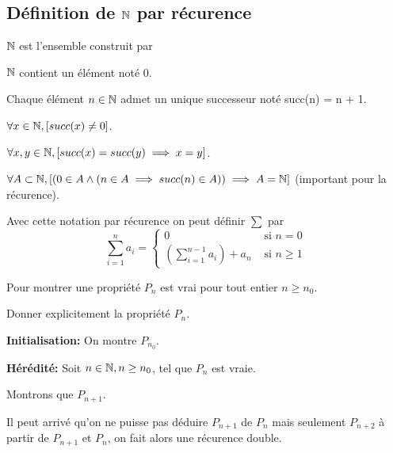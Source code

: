 \documentclass[a4paper, 12pt]{article}
\begin{document}
\subsection{Définition de $\mathbb{N}$ par récurence}

\begin{definition}
    $\mathbb{N}$ est l'ensemble construit par

    \vspace{1em}

    \item $\mathbb{N}$ contient un élément noté 0.
    \item Chaque élément $n \in \mathbb{N}$ admet un unique successeur noté succ(n) = n + 1.
    \item $\forall x \in \mathbb{N}, [succ(x) \neq 0]$.
    \item $\forall x, y \in \mathbb{N}, [succ(x) = succ(y) \implies x = y]$.
    \item $\forall A \subset \mathbb{N}, [(0 \in A \land (n \in A \implies succ(n) \in A)) \implies A = \mathbb{N}]$
    (important pour la récurence).
\end{definition}

\begin{remark}
    Avec cette notation par récurence on peut définir $\sum$ par
    \begin{equation*}
        \sum_{i=1}^{n}a_i =
        \begin{cases}
            0 &\text{ si } n = 0\\
            (\sum_{i=1}^{n-1}a_i) + a_n &\text{ si } n \geq 1
        \end{cases}
    \end{equation*}
\end{remark}

\begin{methode}
    Pour montrer une propriété $P_n$ est vrai pour tout entier $n \geq n_0$.

    \item Donner explicitement la propriété $P_n$.
    \item \textbf{Initialisation:} On montre $P_{n_0}$.
    \item \textbf{Hérédité:} Soit $n \in \mathbb{N}, n \geq n_0$, tel que $P_n$ est vraie.
    \item Montrons que $P_{n+1}$.
\end{methode}

\begin{remark}
    Il peut arrivé qu'on ne puisse pas déduire $P_{n+1}$ de $P_n$ mais seulement $P_{n+2}$
    à partir de $P_{n+1}$ et $P_n$, on fait alors une récurence double.
\end{remark}
\end{document}
